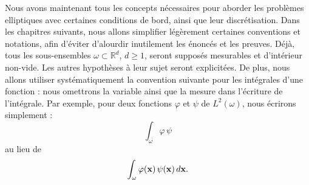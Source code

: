 \documentclass[11pt]{book}
\newtheorem{lemma}[theorem]{Lemme}
\newtheorem{remark}[theorem]{Remarque}
\newcommand{\br}{\begin{remark}}
\newcommand{\er}{\end{remark}}
\newcommand{\bl}{\begin{lemma}}
\newcommand{\el}{\end{lemma}}
\newcommand{\cqfd}{{$\mbox{}$\hfill$\square$}}
\def\x{{\bf x}}
\newcommand{\R}{\mathbb{R}}
\begin{document}
%
%
%
%

Nous avons maintenant tous les concepts nécessaires pour aborder les problèmes elliptiques avec certaines conditions de bord, ainsi que leur discrétisation. Dans les chapitres suivants, nous allons simplifier légèrement certaines conventions et notations, afin d'éviter d'alourdir inutilement les énoncés et les preuves. Déjà, tous les sous-ensembles $\omega \subset \R^d$, $d\geq1$, seront supposés mesurables et d'intérieur non-vide. Les autres hypothèses à leur sujet seront explicitées. 
%
De plus, nous allons utiliser systématiquement la convention suivante pour les intégrales d'une fonction : nous omettrons la variable ainsi que la mesure dans l'écriture de l'intégrale. Par exemple, pour deux fonctions $\varphi$ et $\psi$ de $L^2(\omega)$, nous écrirons simplement :
\[
\int_\omega \varphi \, \psi
\]
au lieu de 
\[
\int_\omega \varphi (\x) \, \psi (\x) \, d\x.
\]
\end{document}
